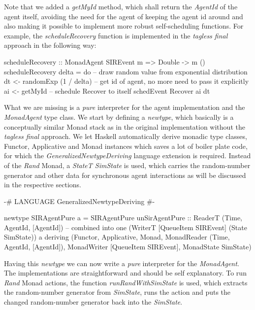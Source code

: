 Note that we added a \textit{getMyId} method, which shall return the \textit{AgentId} of the agent itself, avoiding the need for the agent of keeping the agent id around and also making it possible to implement more robust self-scheduling functions. For example, the \textit{scheduleRecovery} function is implemented in the \textit{tagless final} approach in the following way:

\begin{HaskellCode}
scheduleRecovery :: MonadAgent SIREvent m => Double -> m ()
scheduleRecovery delta = do
  -- draw random value from exponential distribution
  dt <- randomExp (1 / delta)
  -- get id of agent, no more need to pass it explicitly
  ai <- getMyId
  -- schedule Recover to itself
  schedEvent Recover ai dt
\end{HaskellCode}

What we are missing is a \textit{pure} interpreter for the agent implementation and the \textit{MonadAgent} type class. We start by defining a \textit{newtype}, which basically is a conceptually similar Monad stack as in the original implementation without the \textit{tagless final} approach. We let Haskell automatically derive monadic type classes, Functor, Applicative and Monad instances which saves a lot of boiler plate code, for which the \textit{GeneralizedNewtypeDeriving} language extension is required. Instead of the \textit{Rand} Monad, a \textit{StateT SimState} is used, which carries the random-number generator and other data  for synchronous agent interactions as will be discussed in the respective sections.

\begin{HaskellCode}
{-# LANGUAGE GeneralizedNewtypeDeriving #-}

newtype SIRAgentPure a = SIRAgentPure 
  { unSirAgentPure :: ReaderT (Time, AgentId, [AgentId]) -- combined into one
                        (WriterT [QueueItem SIREvent]
                          (State SimState)) a}
  deriving (Functor, Applicative, Monad, 
            MonadReader (Time, AgentId, [AgentId]),
            MonadWriter [QueueItem SIREvent],  
            MonadState SimState)
\end{HaskellCode}

Having this \textit{newtype} we can now write a \textit{pure} interpreter for the \textit{MonadAgent}. The implementations are straightforward and should be self explanatory. To run \textit{Rand} Monad actions, the function \textit{runRandWithSimState} is used, which extracts the random-number generator from \textit{SimState}, runs the action and puts the changed random-number generator back into the \textit{SimState}.

